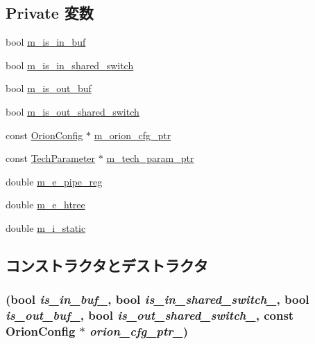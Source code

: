 \subsection*{Private 変数}
\begin{DoxyCompactItemize}
\item 
bool \hyperlink{classClock_a5a84bce908e5182e8fc021d6560dd096}{m\_\-is\_\-in\_\-buf}
\item 
bool \hyperlink{classClock_a9fd4e7ce42d4a34ec79cdcc596ab8337}{m\_\-is\_\-in\_\-shared\_\-switch}
\item 
bool \hyperlink{classClock_a26ae4c597cc6adb05496a9793bcb0b1b}{m\_\-is\_\-out\_\-buf}
\item 
bool \hyperlink{classClock_a117999cd421d4f36ae63ed097adf937a}{m\_\-is\_\-out\_\-shared\_\-switch}
\item 
const \hyperlink{classOrionConfig}{OrionConfig} $\ast$ \hyperlink{classClock_a84de60ae1f7ca812df5347e27a658c77}{m\_\-orion\_\-cfg\_\-ptr}
\item 
const \hyperlink{classTechParameter}{TechParameter} $\ast$ \hyperlink{classClock_a11d1644aa2bfe0e16783dface6fadf13}{m\_\-tech\_\-param\_\-ptr}
\item 
double \hyperlink{classClock_a881412c2f26fab90d8d36fd6b8e73cbe}{m\_\-e\_\-pipe\_\-reg}
\item 
double \hyperlink{classClock_a4a99607352a2d52902a14e216398552c}{m\_\-e\_\-htree}
\item 
double \hyperlink{classClock_a16f0c9e5942378eab4d83da3c61aba7f}{m\_\-i\_\-static}
\end{DoxyCompactItemize}


\subsection{コンストラクタとデストラクタ}
\hypertarget{classClock_afe197343ad0f904373af54b8b995fc77}{
\subsubsection[{Clock}]{ (bool {\em is\_\-in\_\-buf\_\-}, \/  bool {\em is\_\-in\_\-shared\_\-switch\_\-}, \/  bool {\em is\_\-out\_\-buf\_\-}, \/  bool {\em is\_\-out\_\-shared\_\-switch\_\-}, \/  const {\bf OrionConfig} $\ast$ {\em orion\_\-cfg\_\-ptr\_\-})}}
\label{classClock_afe197343ad0f904373af54b8b995fc77}



